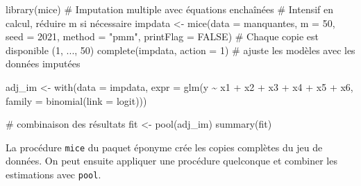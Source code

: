 \documentclass[
  11pt,
  letterpaper,
]{scrbook}
\newenvironment{Shaded}{\begin{snugshade}}{\end{snugshade}}
\newcommand{\AttributeTok}[1]{\textcolor[rgb]{0.40,0.45,0.13}{#1}}
\newcommand{\CommentTok}[1]{\textcolor[rgb]{0.37,0.37,0.37}{#1}}
\newcommand{\ConstantTok}[1]{\textcolor[rgb]{0.56,0.35,0.01}{#1}}
\newcommand{\DecValTok}[1]{\textcolor[rgb]{0.68,0.00,0.00}{#1}}
\newcommand{\FunctionTok}[1]{\textcolor[rgb]{0.28,0.35,0.67}{#1}}
\newcommand{\NormalTok}[1]{\textcolor[rgb]{0.00,0.23,0.31}{#1}}
\newcommand{\OtherTok}[1]{\textcolor[rgb]{0.00,0.23,0.31}{#1}}
\newcommand{\SpecialCharTok}[1]{\textcolor[rgb]{0.37,0.37,0.37}{#1}}
\newcommand{\StringTok}[1]{\textcolor[rgb]{0.13,0.47,0.30}{#1}}
\theoremstyle{definition}
\theoremstyle{remark}
\begin{document}
\begin{Shaded}
\begin{Highlighting}[]
\FunctionTok{library}\NormalTok{(mice)}
\CommentTok{\# Imputation multiple avec équations enchaînées}
\CommentTok{\# Intensif en calcul, réduire \textasciigrave{}m\textasciigrave{} si nécessaire}
\NormalTok{impdata }\OtherTok{\textless{}{-}} \FunctionTok{mice}\NormalTok{(}\AttributeTok{data =}\NormalTok{ manquantes,}
                \AttributeTok{m =} \DecValTok{50}\NormalTok{,}
                \AttributeTok{seed =} \DecValTok{2021}\NormalTok{,}
                \AttributeTok{method =} \StringTok{"pmm"}\NormalTok{,}
                \AttributeTok{printFlag =} \ConstantTok{FALSE}\NormalTok{)}
\CommentTok{\# Chaque copie est disponible (1, ..., 50)}
\FunctionTok{complete}\NormalTok{(impdata, }\AttributeTok{action =} \DecValTok{1}\NormalTok{)}
\CommentTok{\# ajuste les modèles avec les données imputées}

\NormalTok{adj\_im }\OtherTok{\textless{}{-}} \FunctionTok{with}\NormalTok{(}\AttributeTok{data =}\NormalTok{ impdata,}
               \AttributeTok{expr =} \FunctionTok{glm}\NormalTok{(y }\SpecialCharTok{\textasciitilde{}}\NormalTok{ x1 }\SpecialCharTok{+}\NormalTok{ x2 }\SpecialCharTok{+}\NormalTok{ x3 }\SpecialCharTok{+}\NormalTok{ x4 }\SpecialCharTok{+}\NormalTok{ x5 }\SpecialCharTok{+}\NormalTok{ x6,}
                          \AttributeTok{family =} \FunctionTok{binomial}\NormalTok{(}\AttributeTok{link =} \StringTok{\textquotesingle{}logit\textquotesingle{}}\NormalTok{)))}

\CommentTok{\# combinaison des résultats }
\NormalTok{fit }\OtherTok{\textless{}{-}} \FunctionTok{pool}\NormalTok{(adj\_im)}
\FunctionTok{summary}\NormalTok{(fit)}
\end{Highlighting}
\end{Shaded}

La procédure \texttt{mice} du paquet éponyme crée les copies complètes
du jeu de données. On peut ensuite appliquer une procédure quelconque et
combiner les estimations avec \texttt{pool}.
\end{document}
